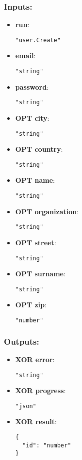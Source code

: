 \subsubsection*{Inputs:}
\begin{itemize}
    \item \textbf{run}: 
\begin{lstlisting}
"user.Create"
\end{lstlisting}
    \item \textbf{email}: 
\begin{lstlisting}
"string"
\end{lstlisting}
    \item \textbf{password}: 
\begin{lstlisting}
"string"
\end{lstlisting}
    \item \textbf{OPT city}: 
\begin{lstlisting}
"string"
\end{lstlisting}
    \item \textbf{OPT country}: 
\begin{lstlisting}
"string"
\end{lstlisting}
    \item \textbf{OPT name}: 
\begin{lstlisting}
"string"
\end{lstlisting}
    \item \textbf{OPT organization}: 
\begin{lstlisting}
"string"
\end{lstlisting}
    \item \textbf{OPT street}: 
\begin{lstlisting}
"string"
\end{lstlisting}
    \item \textbf{OPT surname}: 
\begin{lstlisting}
"string"
\end{lstlisting}
    \item \textbf{OPT zip}: 
\begin{lstlisting}
"number"
\end{lstlisting}
  \end{itemize}

\subsubsection*{Outputs:}
\begin{itemize}
    \item \textbf{XOR error}: 
\begin{lstlisting}
"string"
\end{lstlisting}
    \item \textbf{XOR progress}: 
\begin{lstlisting}
"json"
\end{lstlisting}
    \item \textbf{XOR result}: 
\begin{lstlisting}
{
  "id": "number"
}
\end{lstlisting}
  \end{itemize}

